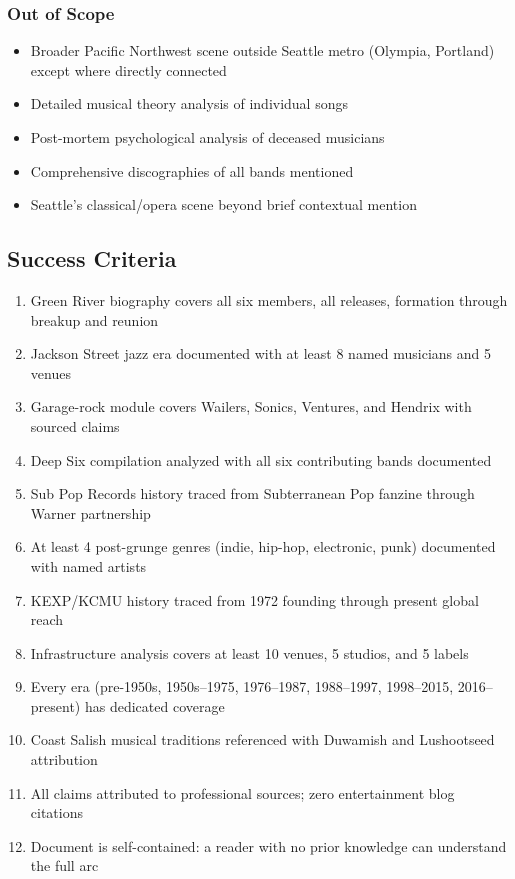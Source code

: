 \documentclass[11pt,letterpaper]{article}
\begin{document}
\subsubsection{Out of Scope}
\begin{itemize}[nosep]
  \item Broader Pacific Northwest scene outside Seattle metro (Olympia, Portland) except where directly connected
  \item Detailed musical theory analysis of individual songs
  \item Post-mortem psychological analysis of deceased musicians
  \item Comprehensive discographies of all bands mentioned
  \item Seattle's classical/opera scene beyond brief contextual mention
\end{itemize}

\subsection{Success Criteria}

\begin{enumerate}[label=\textbf{\arabic*.}]
  \item Green River biography covers all six members, all releases, formation through breakup and reunion
  \item Jackson Street jazz era documented with at least 8 named musicians and 5 venues
  \item Garage-rock module covers Wailers, Sonics, Ventures, and Hendrix with sourced claims
  \item Deep Six compilation analyzed with all six contributing bands documented
  \item Sub Pop Records history traced from Subterranean Pop fanzine through Warner partnership
  \item At least 4 post-grunge genres (indie, hip-hop, electronic, punk) documented with named artists
  \item KEXP/KCMU history traced from 1972 founding through present global reach
  \item Infrastructure analysis covers at least 10 venues, 5 studios, and 5 labels
  \item Every era (pre-1950s, 1950s--1975, 1976--1987, 1988--1997, 1998--2015, 2016--present) has dedicated coverage
  \item Coast Salish musical traditions referenced with Duwamish and Lushootseed attribution
  \item All claims attributed to professional sources; zero entertainment blog citations
  \item Document is self-contained: a reader with no prior knowledge can understand the full arc
\end{enumerate}
\end{document}
